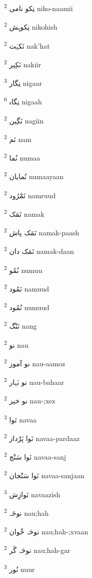 \documentclass[12pt]{article}
\begin{document}
\begin{multicols}{5}
{\ur نِکو نامی}   \textsuperscript{2} niko-naamii

{\ur نِکوہِش}   \textsuperscript{2} nikohish

{\ur نَکہَت}   \textsuperscript{2} nak'hat

{\ur نَکِیر}   \textsuperscript{2} nakiir

{\ur نِگار}   \textsuperscript{3} nigaar

{\ur نِگاہ}   \textsuperscript{6} nigaah

{\ur نَگِین}   \textsuperscript{2} nagiin

{\ur نَم}   \textsuperscript{2} nam

{\ur نُما}   \textsuperscript{2} numaa

{\ur نُمایان}   \textsuperscript{2} numaayaan

{\ur نَمْرُود}   \textsuperscript{2} namruud

{\ur نَمَک}   \textsuperscript{2} namak

{\ur نَمَک پاش}   \textsuperscript{2} namak-paash

{\ur نَمَک دان}   \textsuperscript{2} namak-daan

{\ur نُمُو}   \textsuperscript{2} numuu

{\ur نَمُود}   \textsuperscript{2} namuud

{\ur نُمُود}   \textsuperscript{2} numuud

{\ur نَنْگ}   \textsuperscript{2} nang

{\ur نو}   \textsuperscript{2} nau

{\ur نو آموز}   \textsuperscript{2} nau-aamoz

{\ur نو بَہار}   \textsuperscript{2} nau-bahaar

{\ur نو خیز}   \textsuperscript{2} nau-;xez

{\ur نَوا}   \textsuperscript{3} navaa

{\ur نَوا پَرْداز}   \textsuperscript{2} navaa-pardaaz

{\ur نَوا سَنْج}   \textsuperscript{2} navaa-sanj

{\ur نَوا سَنْجان}   \textsuperscript{2} navaa-sanjaan

{\ur نَوازِش}   \textsuperscript{3} navaazish

{\ur نوحَہ}   \textsuperscript{2} nau;hah

{\ur نوحَہ خْوان}   \textsuperscript{2} nau;hah-;xvaan

{\ur نوحَہ گَر}   \textsuperscript{2} nau;hah-gar

{\ur نُور}   \textsuperscript{3} nuur


\end{multicols}
\end{document}
